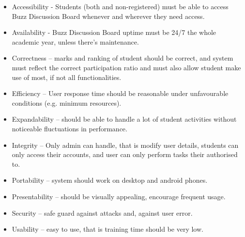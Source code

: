 
%

\begin{itemize}
  \item Accessibility - Students (both   and non-registered) must be able to access Buzz Discussion Board 		whenever and wherever they need access.
  \item Availability - Buzz Discussion Board uptime must be 24/7 the whole academic year, unless there’s 		maintenance.
  \item Correctness – marks and ranking of student should be correct, and system must reflect the correct 		participation ratio and must also allow student make use of most, if not all functionalities.
  \item Efficiency – User response time should be reasonable under unfavourable conditions (e.g. minimum 		resources).
  \item Expandability – should be able to handle a lot of student activities without noticeable 				fluctuations in performance.
  \item Integrity – Only admin can handle, that is modify user details, students can only access their 			accounts, and user can only perform tasks their authorised to.
  \item Portability – system should work on desktop and android phones.
  \item Presentability – should be visually appealing, encourage frequent usage.
  \item Security – safe guard against attacks and, against user error.
  \item Usability – easy to use, that is training time should be very low.
\end{itemize}

%